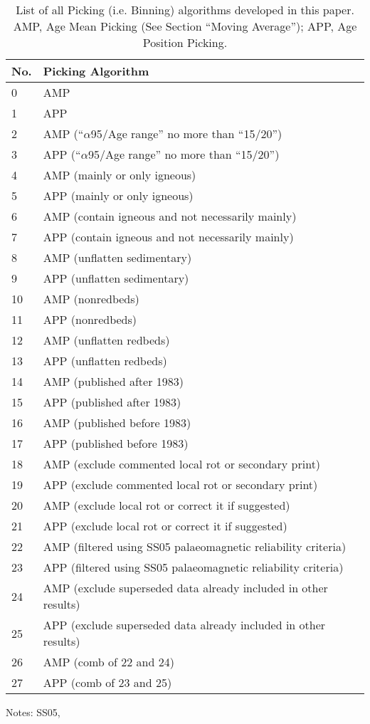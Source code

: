 \begin{table}
\centering
\caption{List of all Picking (i.e. Binning) algorithms developed in this paper.
         AMP, Age Mean Picking (See Section ``Moving Average''); APP, Age
         Position Picking.}\label{tab-pick}
\begin{tabular}{@{}ll@{}}
\toprule
No. & Picking Algorithm \\ \midrule
0 & AMP \\
1 & APP \\
2 & AMP (``$\alpha$95/Age range'' no more than ``15/20'') \\
3 & APP (``$\alpha$95/Age range'' no more than ``15/20'') \\
4 & AMP (mainly or only igneous) \\
5 & APP (mainly or only igneous) \\
6 & AMP (contain igneous and not necessarily mainly) \\
7 & APP (contain igneous and not necessarily mainly) \\
8 & AMP (unflatten sedimentary) \\
9 & APP (unflatten sedimentary) \\
10 & AMP (nonredbeds) \\
11 & APP (nonredbeds) \\
12 & AMP (unflatten redbeds) \\
13 & APP (unflatten redbeds) \\
14 & AMP (published after 1983) \\
15 & APP (published after 1983) \\
16 & AMP (published before 1983) \\
17 & APP (published before 1983) \\
18 & AMP (exclude commented local rot or secondary print) \\
19 & APP (exclude commented local rot or secondary print) \\
20 & AMP (exclude local rot or correct it if suggested) \\
21 & APP (exclude local rot or correct it if suggested) \\
22 & AMP (filtered using SS05 palaeomagnetic reliability criteria) \\
23 & APP (filtered using SS05 palaeomagnetic reliability criteria) \\
24 & AMP (exclude superseded data already included in other results) \\
25 & APP (exclude superseded data already included in other results) \\
26 & AMP (comb of 22 and 24) \\
27 & APP (comb of 23 and 25) \\ \bottomrule
\end{tabular}
\raggedright{Notes: SS05,~\cite{S05}}
\end{table}

